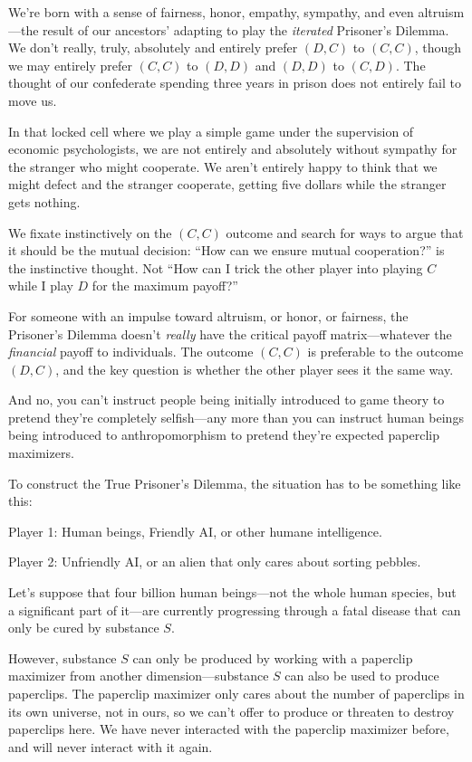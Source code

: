  We're born with a sense of fairness, honor,
empathy, sympathy, and even altruism---the result of our
ancestors' adapting to play the \textit{iterated}
Prisoner's Dilemma. We don't really,
truly, absolutely and entirely prefer $(D,C)$ to $(C,C)$, though we may
entirely prefer $(C,C)$ to $(D,D)$ and $(D,D)$ to $(C,D)$. The thought of our
confederate spending three years in prison does not entirely fail to
move us.


 In that locked cell where we play a simple game under the
supervision of economic psychologists, we are not entirely and
absolutely without sympathy for the stranger who might cooperate. We
aren't entirely happy to think that we might defect and
the stranger cooperate, getting five dollars while the stranger gets
nothing.


 We fixate instinctively on the $(C,C)$ outcome and search for ways
to argue that it should be the mutual decision: ``How
can we ensure mutual cooperation?'' is the
instinctive thought. Not ``How can I trick the other
player into playing $C$ while I play $D$ for the maximum
payoff?''


 For someone with an impulse toward altruism, or honor, or
fairness, the Prisoner's Dilemma
doesn't \textit{really} have the critical payoff
matrix---whatever the \textit{financial} payoff to individuals. The
outcome $(C,C)$ is preferable to the outcome $(D,C)$, and the key question
is whether the other player sees it the same way.


 And no, you can't instruct people being initially
introduced to game theory to pretend they're completely
selfish---any more than you can instruct human beings being introduced
to anthropomorphism to pretend they're expected
paperclip maximizers.


 To construct the True Prisoner's Dilemma, the
situation has to be something like this:


 Player 1: Human beings, Friendly AI, or other humane
intelligence.


 Player 2: Unfriendly AI, or an alien that only cares about sorting
pebbles.


 Let's suppose that four billion human beings---not
the whole human species, but a significant part of it---are currently
progressing through a fatal disease that can only be cured by substance
$S$.


 However, substance $S$ can only be produced by working with a
paperclip maximizer from another dimension---substance $S$ can also be
used to produce paperclips. The paperclip maximizer only cares about
the number of paperclips in its own universe, not in ours, so we
can't offer to produce or threaten to destroy
paperclips here. We have never interacted with the paperclip maximizer
before, and will never interact with it again.


